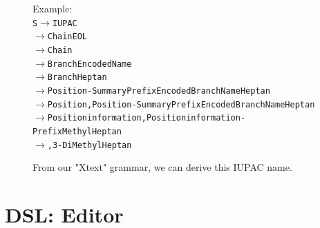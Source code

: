 \documentclass[
fontsize=11pt,
paper=a4,
abstract=true,
numbers=noenddot,
listof=totoc,
bibliography=totoc,
twoside,
open=right,
cleardoublepage=plain,
parskip=half+, %
BCOR=1cm, %
]{scrreprt}
\begin{document}
\begin{figure}[H]
    \noindent Example:\\
    \texttt{\phantom{XXXX}S$\rightarrow$\space IUPAC}\\
    \texttt{\phantom{X}$\rightarrow$\space ChainEOL}\\
    \texttt{\phantom{X}$\rightarrow$\space Chain}\\
    \texttt{\phantom{X}$\rightarrow$\space BranchEncodedName}\\ 
    \texttt{\phantom{X}$\rightarrow$\space BranchHeptan}\\
    \texttt{\phantom{X}$\rightarrow$\space Position-SummaryPrefixEncodedBranchNameHeptan}\\
    \texttt{\phantom{X}$\rightarrow$\space Position,Position-SummaryPrefixEncodedBranchNameHeptan}\\
    \texttt{\phantom{X}$\rightarrow$\space Positioninformation,Positioninformation-PrefixMethylHeptan}\\
    \texttt{\phantom{X}$\rightarrow$,3-DiMethylHeptan}\\
    \caption{From our "Xtext" grammar, we can derive this IUPAC name.}
    \label{fig:ExampleWordFromCFG}
\end{figure}

\section{DSL: Editor}\label{ss:DSLEditor}
\end{document}
